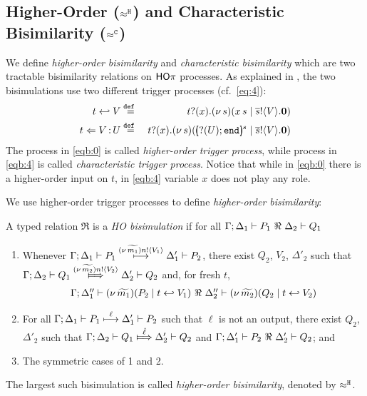 \subsection{Higher-Order ($\approx^\mathtt{H}$) and  Characteristic  Bisimilarity ($\approx^\mathtt{C}$)}
\label{ss:hwb}

We define \emph{higher-order bisimilarity} and 
\emph{characteristic bisimilarity} which are
two tractable bisimilarity relations on $\mathsf{HO}\pi$ processes.
As explained in ,
the two bisimulations 
use two different trigger processes (cf.~\eqref{eq:4}):
%
\begin{eqnarray}
	t \hookleftarrow V	& \stackrel{\mathtt{def}\ }{=} &	t ? (x) . (\nu\, s)(x\, {s} \;|\; \overline{s} ! \langle V \rangle . \mathbf{0})							\label{eqb:0} \\
	t \Leftarrow V{\,:\,}U	& \stackrel{\mathtt{def}\ }{=} &	t ? (x) . (\nu\, s)([\!\!(? (U) ; \mathtt{end})\!\!]^{s} \;|\; \overline{s} ! \langle V \rangle . \mathbf{0})	\label{eqb:4}
\end{eqnarray}
%
The process in \eqref{eqb:0} is called \emph{higher-order trigger process},
while process in \eqref{eqb:4} is called \emph{characteristic trigger process}.
Notice that while 
in \eqref{eqb:0} there is a higher-order input on $t$, 
in \eqref{eqb:4} variable $x$ does not play any role.

We use higher-order trigger processes to define \emph{higher-order bisimilarity}:

\begin{definition}
	\label{d:hwb}
	A typed relation $\Re$ is a {\em  HO bisimulation} if 
	for all $\Gamma; \Delta_1 \vdash P_1 \ \Re \  \Delta_2 \vdash Q_1$ 
%
	\begin{enumerate}[1)]
		\item 
				Whenever 
				$\Gamma; \Delta_1 \vdash P_1 \stackrel{(\nu\, \widetilde{m_1}) n ! \langle V_1 \rangle}{\longmapsto} \Delta_1' \vdash P_2$, there exist 
				$Q_2$, $V_2$, $\Delta'_2$ such that 
				$\horel{\Gamma}{\Delta_2}{Q_1}{\Hby{\news{\widetilde{m_2}} \bactout{n}{V_2}}}{\Delta_2'}{Q_2}$ and, for fresh $t$, 
				\[
					\begin{array}{lrlll}
						\Gamma; \Delta''_1  \proves  {\newsp{\widetilde{m_1}}{P_2 \Par \htrigger{t}{V_1}}}
						\ \Re\ 
						\Delta''_2 \proves {\newsp{\widetilde{m_2}}{Q_2 \Par \htrigger{t}{V_2}}}
					\end{array}
				\]
		\item	
				For all $\Gamma; \Delta_1 \vdash P_1 \stackrel{\ell}{\longmapsto} \Delta_1' \vdash P_2$ such that 
				$\ell$ is not an output, 
				there exist $Q_2$, $\Delta'_2$ such that 
				$\horel{\Gamma}{\Delta_2}{Q_1}{\Hby{\hat{\ell}}}{\Delta_2'}{Q_2}$
				and
				$\Gamma; \Delta_1' \vdash P_2 \ \Re \  \Delta_2' \vdash Q_2$; and 

		\item	The symmetric cases of 1 and 2.                
	\end{enumerate}
%
	The largest such bisimulation is called \emph{higher-order bisimilarity}, denoted by $\approx^\mathtt{H}$.
\end{definition}


